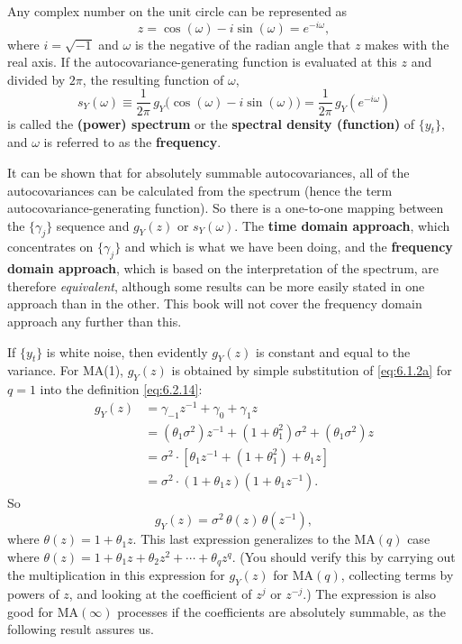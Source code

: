 Any complex number on the unit circle can be represented as
\begin{equation}
  z = \cos(\omega) - i \sin(\omega) = e^{-i\omega},
  \label{eq:6.2.16}
\end{equation}
where $i = \sqrt{-1}$ and $\omega$ is the negative of the radian angle that $z$ makes with the real
axis. If the autocovariance-generating function is evaluated at this $z$ and divided by
$2\pi$, the resulting function of $\omega$,
\begin{equation}
  s_Y(\omega) \equiv \frac{1}{2\pi}\,g_Y\bigl(\cos(\omega) - i\sin(\omega)\bigr)
  = \frac{1}{2\pi}\,g_Y(e^{-i\omega})
  \label{eq:6.2.17}
\end{equation}
is called the \textbf{(power) spectrum} or the \textbf{spectral density (function)} of $\{y_t\}$, and $\omega$
is referred to as the \textbf{frequency}.

It can be shown that for absolutely summable autocovariances, all of the autocovariances
can be calculated from the spectrum (hence the term autocovariance-generating
function). So there is a one-to-one mapping between the $\{\gamma_j\}$ sequence
and $g_Y(z)$ or $s_Y(\omega)$. The \textbf{time domain approach}, which concentrates on $\{\gamma_j\}$ and
which is what we have been doing, and the \textbf{frequency domain approach}, which
is based on the interpretation of the spectrum, are therefore \emph{equivalent}, although
some results can be more easily stated in one approach than in the other. This book
will not cover the frequency domain approach any further than this.

If $\{y_t\}$ is white noise, then evidently $g_Y(z)$ is constant and equal to the variance.
For MA(1), $g_Y(z)$ is obtained by simple substitution of \eqref{eq:6.1.2a} for $q = 1$ into the
definition \eqref{eq:6.2.14}:
\begin{align*}
  g_Y(z) &= \gamma_{-1} z^{-1} + \gamma_0 + \gamma_1 z \\
  &= (\theta_1 \sigma^2) z^{-1} + (1 + \theta_1^2)\sigma^2 + (\theta_1 \sigma^2) z \\
  &= \sigma^2 \cdot [\theta_1 z^{-1} + (1 + \theta_1^2) + \theta_1 z] \\
  &= \sigma^2 \cdot (1 + \theta_1 z)(1 + \theta_1 z^{-1}).
\end{align*}
So
\begin{equation}
  g_Y(z) = \sigma^2\,\theta(z)\,\theta(z^{-1}),
  \label{eq:6.2.18}
\end{equation}
where $\theta(z) = 1 + \theta_1 z$. This last expression generalizes to the $\text{MA}(q)$ case where
$\theta(z) = 1 + \theta_1 z + \theta_2 z^2 + \cdots + \theta_q z^q$. (You should verify this by carrying out the
multiplication in this expression for $g_Y(z)$ for $\text{MA}(q)$, collecting terms by powers
of $z$, and looking at the coefficient of $z^j$ or $z^{-j}$.) The expression is also good for
$\text{MA}(\infty)$ processes if the coefficients are absolutely summable, as the following
result assures us.

